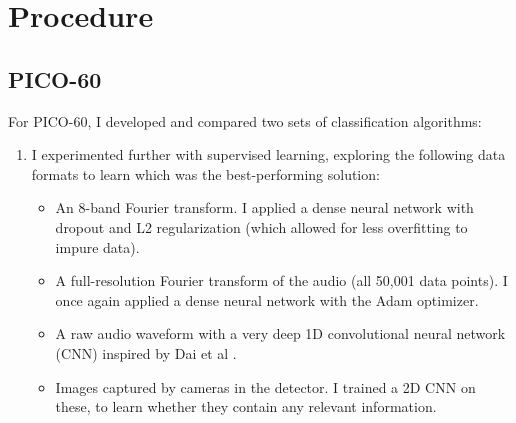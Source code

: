 \documentclass[12pt]{article}
\begin{document}
\section{Procedure}

\subsection{PICO-60}

For PICO-60, I developed and compared two sets of classification algorithms:

\begin{enumerate}
    \item I experimented further with supervised learning, exploring the following data formats to learn which was the best-performing solution:
    \begin{itemize}
        \item An 8-band Fourier transform. I applied a dense neural network with dropout \cite{dropout} and L2 regularization (which allowed for less overfitting to impure data).
        \item A full-resolution Fourier transform of the audio (all 50,001 data points). I once again applied a dense neural network with the Adam \cite{adam} optimizer.
        \item A raw audio waveform with a very deep 1D convolutional neural network (CNN) inspired by Dai et al \cite{verydeepconvnets}.
        \item Images captured by cameras in the detector. I trained a 2D CNN on these, to learn whether they contain any relevant information.
    \end{itemize}
    \begin{figure}[ht]
        \centering
        \qquad

\end{figure}
\end{enumerate}
\end{document}
